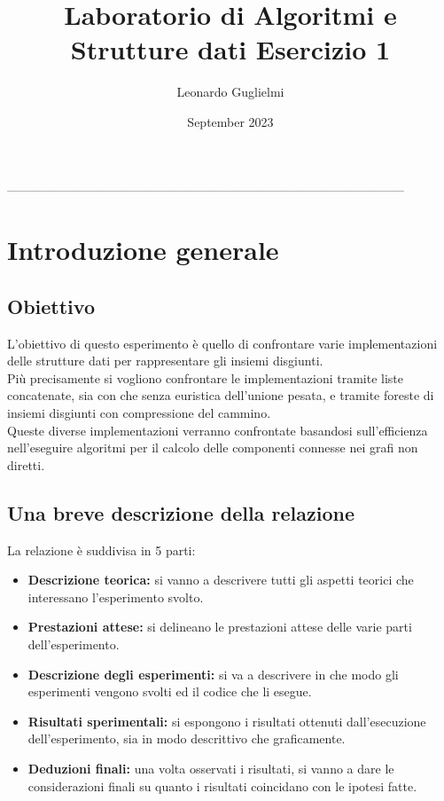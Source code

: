 \documentclass[12pt]{article}
\title{Laboratorio di Algoritmi e Strutture dati Esercizio 1}
\author{Leonardo Guglielmi}
\date{September 2023}
\begin{document}
\maketitle
\tableofcontents
------------------------------------------------------------------------------------------------
\section{Introduzione generale}

\subsection{Obiettivo}
L'obiettivo di questo esperimento è quello di confrontare varie implementazioni delle strutture dati per rappresentare gli insiemi disgiunti.\\
Più precisamente si vogliono confrontare le implementazioni tramite liste concatenate, sia con che senza euristica dell'unione pesata, e tramite foreste di insiemi disgiunti con compressione del cammino.\\
Queste diverse implementazioni verranno confrontate basandosi sull'efficienza nell'eseguire algoritmi per il calcolo delle componenti connesse nei grafi non diretti.

\subsection{Una breve descrizione della relazione}
La relazione è suddivisa in 5 parti:
\begin{itemize}
    \item \textbf{Descrizione teorica:} si vanno a descrivere tutti gli aspetti teorici che interessano l'esperimento svolto.

    \item \textbf{Prestazioni attese:} si delineano le prestazioni attese delle varie parti dell'esperimento.

    \item \textbf{Descrizione degli esperimenti:} si va a descrivere in che modo gli esperimenti vengono svolti ed il codice che li esegue.

    \item \textbf{Risultati sperimentali:} si espongono i risultati ottenuti dall'esecuzione dell'esperimento, sia in modo descrittivo che graficamente.

    \item \textbf{Deduzioni finali:} una volta osservati i risultati, si vanno a dare le considerazioni finali su quanto i risultati coincidano con le ipotesi fatte.
\end{itemize}
\end{document}
